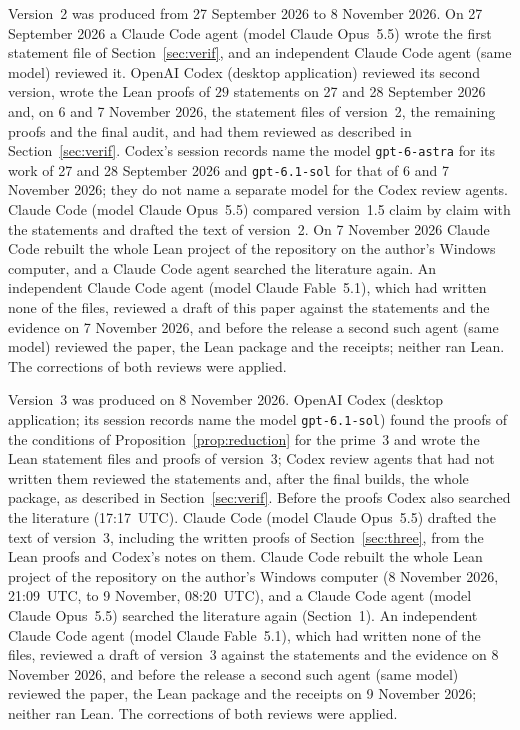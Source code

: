 \documentclass[11pt]{article}
\theoremstyle{remark}
\begin{document}
Version~2 was produced from 27 September 2026 to 8 November 2026. On
27 September 2026 a Claude Code agent (model Claude Opus~5.5) wrote the first
statement file of Section~\ref{sec:verif}, and an independent Claude Code agent (same
model) reviewed it. OpenAI Codex (desktop application) reviewed its second version,
wrote the Lean proofs of $29$ statements on 27 and 28 September 2026 and, on 6 and
7 November 2026, the statement files of version~2, the remaining proofs and the
final audit, and had them reviewed as described in Section~\ref{sec:verif}. Codex's session
records name the model \texttt{gpt-6-astra} for its work of 27 and 28 September 2026
and \texttt{gpt-6.1-sol} for that of 6 and 7 November 2026; they do not name a
separate model for the Codex review agents. Claude Code (model
Claude Opus~5.5) compared version~1.5 claim by claim with the
statements and drafted the text of version~2.
On 7 November 2026 Claude Code rebuilt the whole Lean project of the repository on
the author's Windows computer, and a Claude Code agent searched the literature again.
An independent Claude Code agent (model Claude Fable~5.1), which had written none of
the files, reviewed a draft of this paper against the statements and the evidence on
7 November 2026, and before the release a second such agent (same model) reviewed the
paper, the Lean package and the receipts; neither ran Lean. The corrections of both
reviews were applied.

Version~3 was produced on 8 November 2026. OpenAI Codex (desktop application; its session records name the
model \texttt{gpt-6.1-sol}) found the proofs of the conditions of
Proposition~\ref{prop:reduction} for the prime~$3$ and wrote the Lean statement files
and proofs of version~3; Codex review agents that had not written them reviewed the
statements and, after the final builds, the whole package, as described in
Section~\ref{sec:verif}. Before the proofs Codex also searched the
literature (17:17~UTC). Claude Code (model Claude Opus~5.5) drafted the text of
version~3, including the written proofs of Section~\ref{sec:three}, from the Lean
proofs and Codex's notes on them. Claude Code rebuilt the whole Lean project of the
repository on the author's Windows computer (8 November 2026, 21:09~UTC, to
9 November, 08:20~UTC), and a Claude Code agent (model Claude Opus~5.5) searched the
literature again (Section~1). An independent Claude Code agent (model
Claude Fable~5.1), which had written none of the files, reviewed a draft of version~3
against the statements and the evidence on 8 November 2026, and before the release a
second such agent (same model) reviewed the paper, the Lean package and the receipts
on 9 November 2026; neither ran Lean. The corrections of both reviews were applied.
\end{document}
